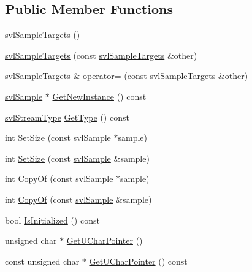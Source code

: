 \subsection*{Public Member Functions}
\begin{DoxyCompactItemize}
\item 
\hyperlink{classsvl_sample_targets_ac9f921451c1dfbce6bad501aaad97c68}{svl\+Sample\+Targets} ()
\item 
\hyperlink{classsvl_sample_targets_aded61e79647f0b49e05a8bad9030f9ca}{svl\+Sample\+Targets} (const \hyperlink{classsvl_sample_targets}{svl\+Sample\+Targets} \&other)
\item 
\hyperlink{classsvl_sample_targets}{svl\+Sample\+Targets} \& \hyperlink{classsvl_sample_targets_a965bfc403c3c928eea0c583e3deeed89}{operator=} (const \hyperlink{classsvl_sample_targets}{svl\+Sample\+Targets} \&other)
\item 
\hyperlink{classsvl_sample}{svl\+Sample} $\ast$ \hyperlink{classsvl_sample_targets_afc8ba05aa433e48e15231157c7d93345}{Get\+New\+Instance} () const 
\item 
\hyperlink{svl_definitions_8h_aa00696d338a58db361335a01fd11e122}{svl\+Stream\+Type} \hyperlink{classsvl_sample_targets_a0084b2b248b248849bcfa910e92b666a}{Get\+Type} () const 
\item 
int \hyperlink{classsvl_sample_targets_aa5464729d31ba293f0785ef9a9763568}{Set\+Size} (const \hyperlink{classsvl_sample}{svl\+Sample} $\ast$sample)
\item 
int \hyperlink{classsvl_sample_targets_a9814be565c027352b5e6e316ced75e22}{Set\+Size} (const \hyperlink{classsvl_sample}{svl\+Sample} \&sample)
\item 
int \hyperlink{classsvl_sample_targets_aabec01406fc42fdb02bf476d9b073fc4}{Copy\+Of} (const \hyperlink{classsvl_sample}{svl\+Sample} $\ast$sample)
\item 
int \hyperlink{classsvl_sample_targets_aab182c9a18295bc72205bb1878c82174}{Copy\+Of} (const \hyperlink{classsvl_sample}{svl\+Sample} \&sample)
\item 
bool \hyperlink{classsvl_sample_targets_a19871a3e24c36e9461b68fd8dda6f620}{Is\+Initialized} () const 
\item 
unsigned char $\ast$ \hyperlink{classsvl_sample_targets_acd6584941b91a121d488e49de6a1aaea}{Get\+U\+Char\+Pointer} ()
\item 
const unsigned char $\ast$ \hyperlink{classsvl_sample_targets_a409dfa9f2adbc442b1a6a9c8110675cd}{Get\+U\+Char\+Pointer} () const 
\item 

\end{DoxyCompactItemize}
